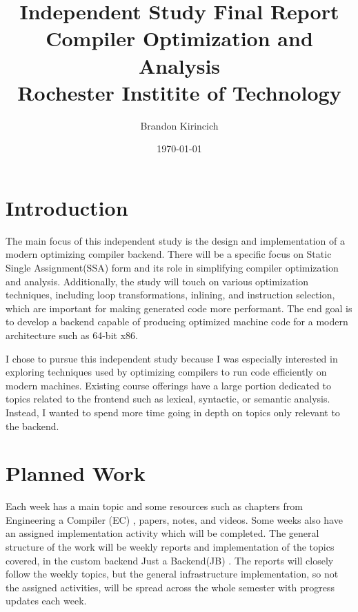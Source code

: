 \documentclass[11pt, a4paper, titlepage]{article}
\begin{document}
\begin{titlepage}
    \title{
        \huge{Independent Study Final Report}\\
        \vspace{0.5cm}
        \Huge{Compiler Optimization and Analysis}\\
        \vspace{0.5cm}
        \Large{Rochester Institite of Technology}
        }
    \author{\Large{Brandon Kirincich}}
    \date{\large{\today}}

    \maketitle
\end{titlepage}

\pagebreak
\tableofcontents
\pagebreak

\section{Introduction}
The main focus of this independent study is the design and implementation of a modern optimizing compiler backend.
There will be a specific focus on Static Single Assignment(SSA) form and its role in simplifying compiler optimization and analysis.
Additionally, the study will touch on various optimization techniques, including loop transformations, inlining, and instruction selection, which are important for making generated code more performant.
The end goal is to develop a backend capable of producing optimized machine code for a modern architecture such as 64-bit x86.

I chose to pursue this independent study because I was especially interested in exploring techniques used by optimizing compilers to run code efficiently on modern machines.
Existing course offerings have a large portion dedicated to topics related to the frontend such as lexical, syntactic, or semantic analysis.
Instead, I wanted to spend more time going in depth on topics only relevant to the backend.

\section{Planned Work}
Each week has a main topic and some resources such as chapters from Engineering a Compiler (EC) \cite{ec}, papers, notes, and videos.
Some weeks also have an assigned implementation activity which will be completed.
The general structure of the work will be weekly reports and implementation of the topics covered, in the custom backend Just a Backend(JB) \cite{jcc}.
The reports will closely follow the weekly topics, but the general infrastructure implementation, so not the assigned activities, will be spread across the whole semester with progress updates each week.
\end{document}
